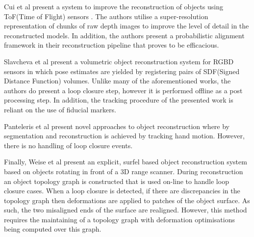 Cui et al present a system to improve the reconstruction of objects using ToF(Time of Flight) sensors \cite{Cui2013}. The authors utilise a super-resolution 
representation of chunks of raw depth images to improve the level of detail in the reconstructed models. In addition, the authors present a probabilistic 
alignment framework in their reconstruction pipeline that proves to be efficacious.

Slavcheva et al \cite{slavcheva2016eccv} present a volumetric object reconstruction system for RGBD sensors in which pose estimates are yielded by registering pairs of 
SDF(Signed Distance Function) volumes. Unlike many of the aforementioned works, the authors do present a loop closure step, however it is 
performed offline as a post processing step. In addition, the tracking procedure of the presented work is reliant on the use of fiducial markers.

Panteleris et al \cite{Pantaleris2015, Panteleris2015b} present novel approaches to object reconstruction where by segmentation and reconstruction is achieved by 
tracking hand motion. However, there is no handling of loop closure events. 

Finally, Weise et al present an explicit, surfel based object reconstruction system \cite{Weise2009} based on objects rotating in front of a 3D 
range scanner. During reconstruction an object topology graph is constructed that is used on-line to handle loop closure cases. When a loop 
closure is detected, if there are discrepancies in the topology graph then deformations are applied to patches of the object surface. As 
such, the two misaligned ends of the surface are realigned. However, this method requires the maintaining of a topology graph with deformation 
optimisations being computed over this graph.